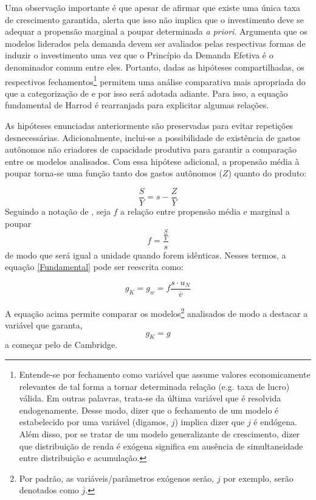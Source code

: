 Uma observação importante é que apesar de \textcite[p.~23]{harrod_essay_1939} afirmar que existe uma única taxa de crescimento garantida, \textcite[p.~83]{robinson_model_1962} alerta que isso não implica que o investimento %
deve se adequar a propensão marginal a poupar determinada \textit{a priori}. Argumenta que os modelos liderados pela demanda devem ser avaliados pelas respectivas formas de induzir o investimento uma vez que o Princípio da Demanda Efetiva é o denominador comum entre eles. Portanto, dadas as hipóteses compartilhadas, os respectivos  fechamentos\footnote{Entende-se por fechamento como variável que assume valores economicamente relevantes de tal forma a tornar determinada relação (e.g. taxa de lucro) válida. Em outras palavras, trata-se da última variável que é resolvida endogenamente. Desse modo, dizer que o fechamento de um modelo é estabelecido por uma variável (digamos, $j$) implica dizer que $j$ é endógena. Além disso, por se tratar de um modelo generalizante de crescimento, dizer que distribuição de renda é exógena significa em ausência de simultaneidade entre distribuição e acumulação.} permitem uma análise comparativa mais apropriada do que a categorização de \textcite{allain_macroeconomic_2014} e por isso será adotada adiante. Para isso, a equação fundamental de Harrod é rearranjada para explicitar algumas relações.


As hipóteses enunciadas anteriormente são preservadas para evitar repetições desnecessárias. Adicionalmente, inclui-se a possibilidade de existência de gastos autônomos não criadores de capacidade produtiva para garantir a comparação entre os modelos analisados. Com essa hipótese adicional, a propensão média à poupar torna-se uma função tanto dos gastos autônomos ($Z$) quanto do produto:

\begin{equation}
\label{Poupanca_Super}
    \frac{S}{Y} = s - \frac{Z}{Y}
\end{equation}
Seguindo a notação de \textcite{serrano_sraffian_1995}, seja $f$ a relação entre propensão média e marginal a poupar
$$
f = \frac{\frac{S}{Y}}{s}
$$
de modo que será igual a unidade quando forem idênticas. Nesses termos, a equação \ref{Fundamental} pode ser reescrita como:

\begin{equation}
 \label{Sintetica}   
g_K = g_w = f\frac{s\cdot u_N}{\overline v}
\end{equation}

A equação acima permite comparar os modelos\footnote{Por padrão, as variáveis/parâmetros exógenos serão, $j$ por exemplo, serão denotados como $\overline j$.} analisados de modo a destacar a variável que garanta, 
$$
g_K = g
$$
a começar pelo de Cambridge.

